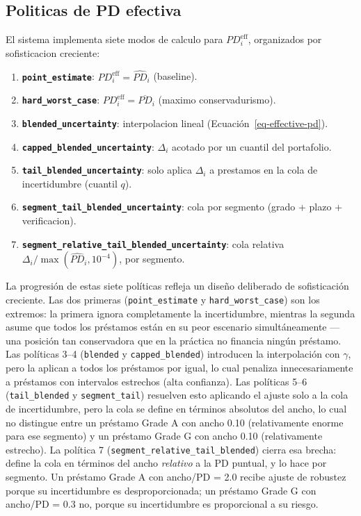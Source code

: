 \documentclass[
  spanish,
  11pt,
  letterpaper,
]{scrbook}
\providecommand{\tightlist}{%
  \setlength{\itemsep}{0pt}\setlength{\parskip}{0pt}}
\theoremstyle{plain}
\theoremstyle{remark}
\begin{document}
\subsection{Politicas de PD efectiva}\label{politicas-de-pd-efectiva}

El sistema implementa siete modos de calculo para \(PD_i^{\text{eff}}\),
organizados por sofisticacion creciente:

\begin{enumerate}
\def\labelenumi{\arabic{enumi}.}
\tightlist
\item
  \textbf{\texttt{point\_estimate}}:
  \(PD_i^{\text{eff}} = \widehat{PD}_i\) (baseline).
\item
  \textbf{\texttt{hard\_worst\_case}}:
  \(PD_i^{\text{eff}} = \overline{PD}_i\) (maximo conservadurismo).
\item
  \textbf{\texttt{blended\_uncertainty}}: interpolacion lineal
  (Ecuación~\ref{eq-effective-pd}).
\item
  \textbf{\texttt{capped\_blended\_uncertainty}}: \(\Delta_i\) acotado
  por un cuantil del portafolio.
\item
  \textbf{\texttt{tail\_blended\_uncertainty}}: solo aplica \(\Delta_i\)
  a prestamos en la cola de incertidumbre (cuantil \(q\)).
\item
  \textbf{\texttt{segment\_tail\_blended\_uncertainty}}: cola por
  segmento (grado + plazo + verificacion).
\item
  \textbf{\texttt{segment\_relative\_tail\_blended\_uncertainty}}: cola
  relativa \(\Delta_i / \max(\widehat{PD}_i, 10^{-4})\), por segmento.
\end{enumerate}

La progresión de estas siete políticas refleja un diseño deliberado de
sofisticación creciente. Las dos primeras (\texttt{point\_estimate} y
\texttt{hard\_worst\_case}) son los extremos: la primera ignora
completamente la incertidumbre, mientras la segunda asume que todos los
préstamos están en su peor escenario simultáneamente --- una posición
tan conservadora que en la práctica no financia ningún préstamo. Las
políticas 3--4 (\texttt{blended} y \texttt{capped\_blended}) introducen
la interpolación con \(\gamma\), pero la aplican a todos los préstamos
por igual, lo cual penaliza innecesariamente a préstamos con intervalos
estrechos (alta confianza). Las políticas 5--6 (\texttt{tail\_blended} y
\texttt{segment\_tail}) resuelven esto aplicando el ajuste solo a la
cola de incertidumbre, pero la cola se define en términos absolutos del
ancho, lo cual no distingue entre un préstamo Grade A con ancho 0.10
(relativamente enorme para ese segmento) y un préstamo Grade G con ancho
0.10 (relativamente estrecho). La política 7
(\texttt{segment\_relative\_tail\_blended}) cierra esa brecha: define la
cola en términos del ancho \emph{relativo} a la PD puntual, y lo hace
por segmento. Un préstamo Grade A con ancho/PD = 2.0 recibe ajuste de
robustez porque su incertidumbre es desproporcionada; un préstamo Grade
G con ancho/PD = 0.3 no, porque su incertidumbre es proporcional a su
riesgo.
\end{document}
